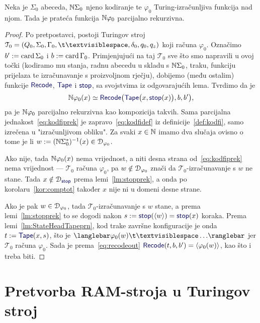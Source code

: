 \begin{teorem}[{name=[parcijalna rekurzivnost pratećih Turing-izračunljivih funkcija]}]\label{tm:tikp}
Neka je $\Sigma_0$ abeceda, ${\mathbb N}\Sigma_0$ njeno kodiranje te $\varphi_0$ Turing-izračunljiva funkcija nad njom. Tada je prateća funkcija ${\mathbb N}\varphi_0$ parcijalno rekurzivna.
\end{teorem}
\begin{proof}
Po pretpostavci, postoji Turingov stroj $\mathcal T_0=(Q_0,\Sigma_0,\Gamma_0,\bl,\delta_0,q_0,q_z)$ koji računa $\varphi_0$. Označimo $b':=\operatorname{card}\Sigma_0$ i $b:=\operatorname{card}\Gamma_0$. Primjenjujući na taj $\mathcal T_0$ sve što smo napravili u ovoj točki (kodiramo mu stanja, radnu abecedu u skladu s ${\mathbb N}\Sigma_0$, traku, funkciju prijelaza te izračunavanje s proizvoljnom rječju), dobijemo (među ostalim) funkcije $\f{Recode}$, $\f{Tape}$ i $\f{stop}$, sa svojstvima iz odgovarajućih lema. Tvrdimo da je
\begin{equation}\label{eq:kodfiprek}
    \N\varphi_0(x)\simeq
    \f{Recode}\bigl(\f{Tape}\bigl(x,\f{stop}(x)\bigr),b,b'\bigr)\text,
\end{equation}
pa je ${\mathbb N}\varphi_0$ parcijalno rekurzivna kao kompozicija takvih. Sama parcijalna jednakost~\eqref{eq:kodfiprek} je zapravo~\eqref{eq:kodfidef} iz definicije~\ref{def:kodfi}, samo izrečena u "izračunljivom obliku". Za svaki $x\in{\mathbb N}$ imamo dva slučaja ovisno o tome je li $w:=({\mathbb N}\Sigma_0^*)^{-1}(x)\in\mathcal D_{\varphi_0}$.

Ako nije, tada ${\mathbb N}\varphi_0(x)$ nema vrijednost, a niti desna strana od~\eqref{eq:kodfiprek} nema vrijednost --- $\mathcal T_0$ računa $\varphi_0$, pa $w\notin\mathcal D_{\varphi_0}$ znači da $\mathcal T_0$-izračunavanje s $w$ ne stane. Tada $x\notin\dom{\f{stop}}$ prema lemi~\ref{lm:stopprek}, a onda po korolaru~\ref{kor:comptot} također $x$ nije ni u domeni desne strane.

Ako je pak $w\in\mathcal D_{\varphi_0}$, tada $\mathcal T_0$-izračunavanje s $w$ stane, a prema lemi~\ref{lm:stopprek} to se dogodi nakon $s:=\f{stop}(\kr w)=\f{stop}(x)$ koraka. Prema lemi~\ref{lm:StateHeadTapeprn}, kod trake završne konfiguracije je onda $t:=\f{Tape}(x,s)$, što je $\knk{\varphi_0(w)\bl\ldots}$ jer $\mathcal T_0$ računa $\varphi_0$. Sada je prema~\eqref{eq:recodeout} $\f{Recode}(t,b,b')=\kr{\varphi_0(w)}$, kao što i treba biti.
\end{proof}

\section{Pretvorba RAM-stroja u Turingov stroj}\label{sec:RAM>Turing}

